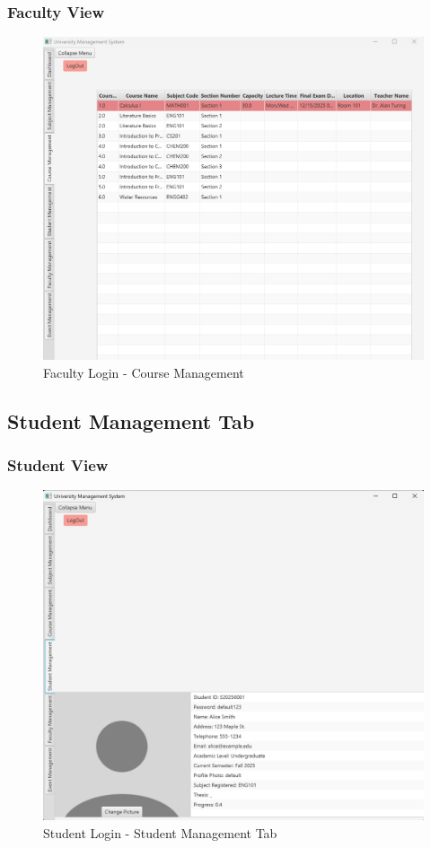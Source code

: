 \subsubsection{Faculty View}
\lipsum[9]

\begin{figure}[ht]
    \centering
        \centering\includegraphics[width=0.7\linewidth]{figures/FAC_Course_Management_Tab.png}
        \caption{Faculty Login - Course Management}
\end{figure}

\newpage
\subsection{Student Management Tab}

\lipsum[9]


\subsubsection{Student View}

\lipsum[9]

\begin{figure}[ht]
    \centering
        \centering\includegraphics[width=0.65\linewidth]{figures/STD_Student_Management_Tab.png}
        \caption{Student Login - Student Management Tab}
\end{figure}


